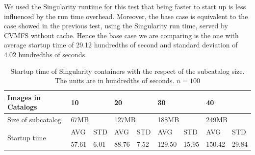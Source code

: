 We used the Singularity runtime for this test that being faster to start up is less
influenced by the run time overhead. Moreover, the base case is equivalent to
the case showed in the previous test, using the Singularity run time, served by
CVMFS without cache. Hence the base case we are comparing is the one with
average startup time of 29.12 hundredths of second and standard deviation of
4.02 hundredths of seconds. 


\begin{table}[]
\begin{tabular}{|l|ll|ll|ll|ll|}
\hline
Images in Catalogs            & \multicolumn{2}{l|}{10}   & \multicolumn{2}{l|}{20}    & \multicolumn{2}{l|}{30}    & \multicolumn{2}{l|}{40}    \\ \hline
Size of subcatalog            & \multicolumn{2}{l|}{67MB} & \multicolumn{2}{l|}{127MB} & \multicolumn{2}{l|}{188MB} & \multicolumn{2}{l|}{249MB} \\ \hline
\multirow{2}{*}{Startup time} & AVG          & STD        & AVG           & STD        & AVG           & STD        & AVG           & STD        \\ \cline{2-9} 
                              & 57.61        & 6.01       & 88.76         & 7.52       & 129.50        & 15.95      & 150.42        & 29.84      \\ \hline
\end{tabular}
\caption{Startup time of Singularity containers with the respect of the subcatalog size. The units are in hundredths of seconds. $n = 100$}
\label{tab:benchmark-catalog}
\end{table}

